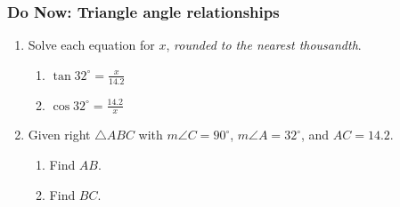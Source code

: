 \documentclass[12pt, oneside]{article}
\begin{document}
\subsubsection*{Do Now: Triangle angle relationships}
 \begin{enumerate}

\item Solve each equation for $x$, \emph{rounded to the nearest thousandth}.  \vspace{.25cm}
  \begin{multicols}{2}
    \begin{enumerate}
      \item $\displaystyle \tan 32^\circ = \frac{x}{14.2}$
      \item $\displaystyle \cos 32^\circ = \frac{14.2}{x}$
    \end{enumerate}
  \end{multicols} \vspace{4cm}

  \item Given right $\triangle ABC$ with $m\angle C=90^\circ$, $m\angle A = 32^\circ$, and $AC=14.2$.
    \begin{center}
    \end{center}
    \begin{enumerate}
      \item Find $AB$. \vspace{3cm}
      \item Find $BC$. \vspace{3cm}
    \end{enumerate}

\newpage


\end{enumerate}
\end{document}
